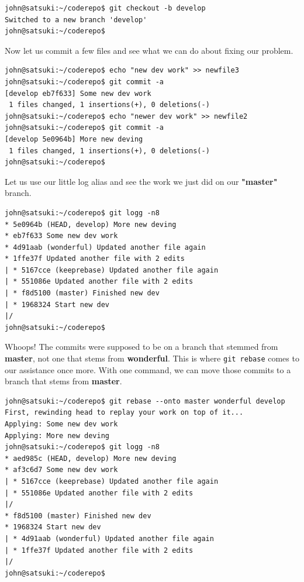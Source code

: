 \begin{Verbatim}
john@satsuki:~/coderepo$ git checkout -b develop
Switched to a new branch 'develop'
john@satsuki:~/coderepo$ 
\end{Verbatim}

Now let us commit a few files and see what we can do about fixing our problem.

\begin{Verbatim}
john@satsuki:~/coderepo$ echo "new dev work" >> newfile3 
john@satsuki:~/coderepo$ git commit -a
[develop eb7f633] Some new dev work
 1 files changed, 1 insertions(+), 0 deletions(-)
john@satsuki:~/coderepo$ echo "newer dev work" >> newfile2 
john@satsuki:~/coderepo$ git commit -a
[develop 5e0964b] More new deving
 1 files changed, 1 insertions(+), 0 deletions(-)
john@satsuki:~/coderepo$ 
\end{Verbatim}

Let us use our little log alias and see the work we just did on our \textbf{"master"} branch.

\begin{Verbatim}
john@satsuki:~/coderepo$ git logg -n8
* 5e0964b (HEAD, develop) More new deving
* eb7f633 Some new dev work
* 4d91aab (wonderful) Updated another file again
* 1ffe37f Updated another file with 2 edits
| * 5167cce (keeprebase) Updated another file again
| * 551086e Updated another file with 2 edits
| * f8d5100 (master) Finished new dev
| * 1968324 Start new dev
|/  
john@satsuki:~/coderepo$ 
\end{Verbatim}

Whoops!  The commits were supposed to be on a branch that stemmed from \textbf{master}, not one that stems from \textbf{wonderful}.  This is where \texttt{git rebase} comes to our assistance once more.  With one command, we can move those commits to a branch that stems from \textbf{master}.

\begin{Verbatim}
john@satsuki:~/coderepo$ git rebase --onto master wonderful develop 
First, rewinding head to replay your work on top of it...
Applying: Some new dev work
Applying: More new deving
john@satsuki:~/coderepo$ git logg -n8
* aed985c (HEAD, develop) More new deving
* af3c6d7 Some new dev work
| * 5167cce (keeprebase) Updated another file again
| * 551086e Updated another file with 2 edits
|/  
* f8d5100 (master) Finished new dev
* 1968324 Start new dev
| * 4d91aab (wonderful) Updated another file again
| * 1ffe37f Updated another file with 2 edits
|/  
john@satsuki:~/coderepo$ 
\end{Verbatim}

